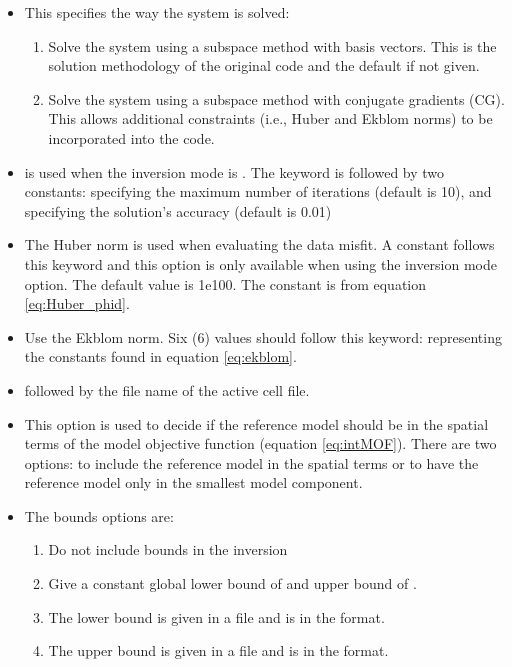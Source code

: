 \begin{itemize}
\begin{enumerate}
\end{enumerate}
%
\item[\fileName{INVMODE}] This specifies the way the system is solved: 
\begin{enumerate}
\item{} Solve the system using a subspace method with basis vectors. This is the solution methodology of the original code and the default if not given.
\item{} Solve the system using a subspace method with conjugate gradients (CG). This allows additional constraints (i.e., Huber and Ekblom norms) to be incorporated into the code.
\end{enumerate}
%
\item[\fileName{CG\_PARAM}] is used when the inversion mode is . The keyword is followed by two constants:  specifying the maximum number of iterations (default is 10), and  specifying the solution's accuracy (default is 0.01)
%
\item[\fileName{HUBER}] The Huber norm is used when evaluating the data misfit. A constant follows this keyword and this option is only available when using the  inversion mode option. The default value is 1e100. The constant is  from equation \ref{eq:Huber_phid}.
%
\item[\fileName{EKBLOM}] Use the Ekblom norm. Six (6) values should follow this keyword:  representing the constants found in equation \ref{eq:ekblom}.
%
\item[\fileName{ACTIVE\_CELLS}] followed by the file name of the active cell file.
%
\item[\fileName{USE\_MREF}] This option is used to decide if the reference model should be in the spatial terms of the model objective function (equation \ref{eq:intMOF}). There are two options:  to include the reference model in the spatial terms or  to have the reference model only in the smallest model component.
%
\item[\fileName{BOUNDS}] The bounds options are:
\begin{enumerate}
\item{} Do not include bounds in the inversion
\item{} Give a constant global lower bound of  and upper bound of .
\item{} The lower bound is given in a file  and is in the  format.
\item{} The upper bound is given in a file  and is in the  format.
\end{enumerate}
%
\end{itemize}

